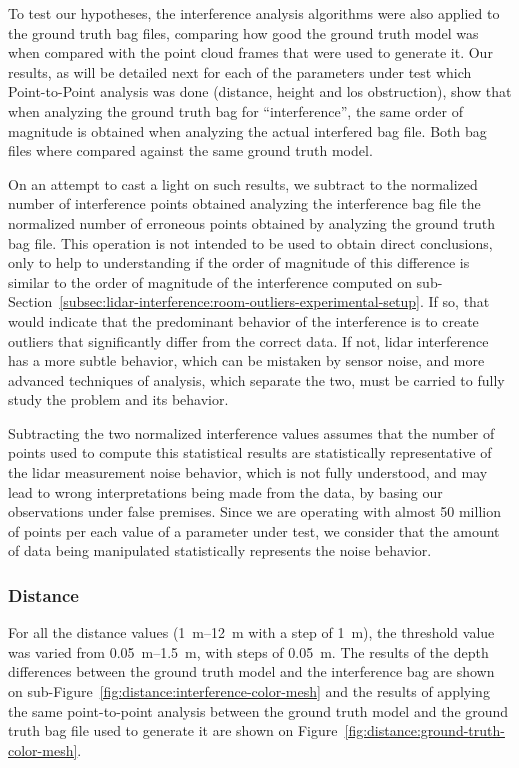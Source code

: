 To test our hypotheses, the interference analysis algorithms were also applied to the ground truth bag files, comparing how good the ground truth model was when compared with the point cloud frames that were used to generate it. Our results, as will be detailed next for each of the parameters under test which Point-to-Point analysis was done (distance, height and \ac{los} obstruction), show that when analyzing the ground truth bag for ``interference'', the same order of magnitude is obtained when analyzing the actual interfered bag file. Both bag files where compared against the same ground truth model.

On an attempt to cast a light on such results, we subtract to the normalized number of interference points obtained analyzing the interference bag file the normalized number of erroneous points obtained by analyzing the ground truth bag file. This operation is not intended to be used to obtain direct conclusions, only to help to understanding if the order of magnitude of this difference is similar to the order of magnitude of the interference computed on sub-Section~\ref{subsec:lidar-interference:room-outliers-experimental-setup}. If so, that would indicate that the predominant behavior of the interference is to create outliers that significantly differ from the correct data. If not, \ac{lidar} interference has a more subtle behavior, which can be mistaken by sensor noise, and more advanced techniques of analysis, which separate the two, must be carried to fully study the problem and its behavior.

Subtracting the two normalized interference values assumes that the number of points used to compute this statistical results are statistically representative of the \ac{lidar} measurement noise behavior, which is not fully understood, and may lead to wrong interpretations being made from the data, by basing our observations under false premises. Since we are operating with almost 50 million of points per each value of a parameter under test, we consider that the amount of data being manipulated statistically represents the noise behavior.

\subsubsection{Distance}
For all the distance values (\SIrange{1}{12}{\meter} with a step of \SI{1}{\meter}), the threshold value was varied from \SIrange{0.05}{1.5}{\meter}, with steps of \SI{0.05}{\meter}. The results of the depth differences between the ground truth model and the interference bag are shown on sub-Figure~\ref{fig:distance:interference-color-mesh} and the results of applying the same point-to-point analysis between the ground truth model and the ground truth bag file used to generate it are shown on Figure~\ref{fig:distance:ground-truth-color-mesh}.

